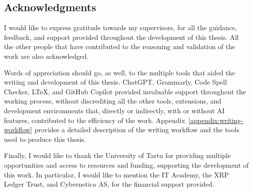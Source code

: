 \newpage

\subsection*{Acknowledgments}

I would like to express gratitude towards my supervisors, for all the guidance, feedback, and support provided throughout the development of this thesis. All the other people that have contributed to the reasoning and validation of the work are also acknowledged.

Words of appreciation should go, as well, to the multiple tools that aided the writing and development of this thesis. ChatGPT, Grammarly, Code Spell Checker, LTeX, and GitHub Copilot provided invaluable support throughout the working process, without discrediting all the other tools, extensions, and development environments that, directly or indirectly, with or without AI features, contributed to the efficiency of the work. Appendix~\ref{appendix:writing-workflow} provides a detailed description of the writing workflow and the tools used to produce this thesis.

Finally, I would like to thank the University of Tartu for providing multiple opportunities and access to resources and funding, supporting the development of this work. In particular, I would like to mention the IT Academy, the XRP Ledger Trust, and Cybernetica AS, for the financial support provided.